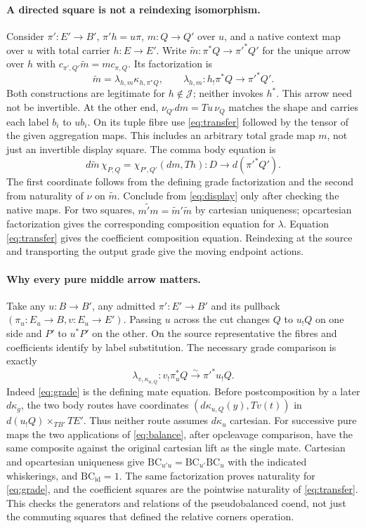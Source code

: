 \documentclass[11pt]{article}
\theoremstyle{definition}
\newcommand{\J}{\mathcal J}
\newcommand{\id}{\mathrm{id}}
\newcommand{\iso}{\xrightarrow{\sim}}
\newcommand{\BC}{\mathrm{BC}}
\begin{document}
\paragraph{A directed square is not a reindexing isomorphism.}
Consider $\pi':E'\to B'$, $\pi'h=u\pi$, $m:Q\to Q'$ over $u$,
and a native context map over $u$ with total carrier $h:E\to E'$.
Write $\widetilde m:\pi^*Q\to\pi'^*Q'$ for the unique arrow over $h$
with $c_{\pi',Q'}\widetilde m=m c_{\pi,Q}$. Its factorization is
\begin{equation}
 \widetilde m=\lambda_{h,m}\kappa_{h,\pi^*Q},\qquad
 \lambda_{h,m}:h_!\pi^*Q\longrightarrow\pi'^*Q'.
 \label{eq:grade}
\end{equation}
Both constructions are legitimate for $h\notin\J$; neither invokes $h^*$.
This arrow need not be invertible. At the other end, $\nu_{Q'}dm=Tu\,\nu_Q$
matches the shape and carries each label $b_i$ to $ub_i$. On its tuple
fibre use \eqref{eq:transfer} followed by the tensor of the given
aggregation maps. This includes an arbitrary total grade map $m$,
not just an invertible display square. The comma body equation is
\[
 d\widetilde m\,\chi_{P,Q}
    =\chi_{P',Q'}(dm,Th):D\longrightarrow d(\pi'^*Q').
\]
The first coordinate follows from the defining grade factorization and
the second from naturality of $\nu$ on $\widetilde m$. Conclude from
\eqref{eq:display} only after checking the native maps. For two squares,
$\widetilde {m'm}=\widetilde m'\widetilde m$ by cartesian uniqueness;
opcartesian factorization gives the corresponding composition equation
for $\lambda$. Equation \eqref{eq:transfer} gives the coefficient
composition equation. Reindexing at the source and transporting the
output grade give the moving endpoint actions.

\paragraph{Why every pure middle arrow matters.}
Take any $u:B\to B'$, any admitted $\pi':E'\to B'$ and its pullback
$(\pi_u:E_u\to B, v:E_u\to E')$. Passing $u$ across the cut changes
$Q$ to $u_!Q$ on one side and $P'$ to $u^*P'$ on the other. On the
source representative the fibres and coefficients identify by label
substitution. The necessary grade comparison is exactly
\begin{equation}
 \lambda_{v,\kappa_{u,Q}}:
 v_!\pi_u^*Q\iso\pi'^*u_!Q .
 \label{eq:balance}
\end{equation}
Indeed \eqref{eq:grade} is the defining mate equation. Before
postcomposition by a later $d\kappa_g$, the two body routes have
coordinates $(d\kappa_{u,Q}(y),Tv(t))$ in
$d(u_!Q)\times_{TB'}TE'$. Thus neither route assumes $d\kappa_u$
cartesian. For successive pure maps the two applications of
\eqref{eq:balance}, after opcleavage comparison, have the same
composite against the original cartesian lift as the single mate.
Cartesian and opcartesian uniqueness give $\BC_{u'u}=\BC_{u'}\BC_u$
with the indicated whiskerings, and $\BC_{\id}=1$. The same
factorization proves naturality for \eqref{eq:grade}, and the
coefficient squares are the pointwise naturality of \eqref{eq:transfer}.
This checks the generators and relations of the pseudobalanced
coend, not just the commuting squares that defined the relative
corners operation.
\end{document}
